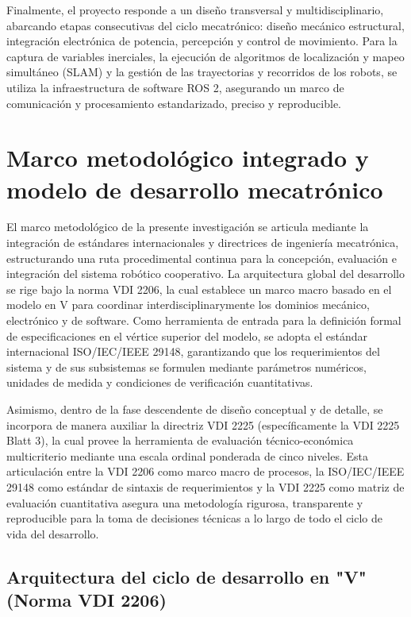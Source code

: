 \noindent
Finalmente, el proyecto responde a un diseño transversal y multidisciplinario, abarcando etapas consecutivas del ciclo mecatrónico: diseño mecánico estructural, integración electrónica de potencia, percepción y control de movimiento. Para la captura de variables inerciales, la ejecución de algoritmos de localización y mapeo simultáneo (SLAM) y la gestión de las trayectorias y recorridos de los robots, se utiliza la infraestructura de software ROS 2, asegurando un marco de comunicación y procesamiento estandarizado, preciso y reproducible.







\section{Marco metodológico integrado y modelo de desarrollo mecatrónico}

\noindent
El marco metodológico de la presente investigación se articula mediante la integración de estándares internacionales y directrices de ingeniería mecatrónica, estructurando una ruta procedimental continua para la concepción, evaluación e integración del sistema robótico cooperativo. La arquitectura global del desarrollo se rige bajo la norma VDI 2206, la cual establece un marco macro basado en el modelo en V para coordinar interdisciplinarymente los dominios mecánico, electrónico y de software. Como herramienta de entrada para la definición formal de especificaciones en el vértice superior del modelo, se adopta el estándar internacional ISO/IEC/IEEE 29148, garantizando que los requerimientos del sistema y de sus subsistemas se formulen mediante parámetros numéricos, unidades de medida y condiciones de verificación cuantitativas.

\noindent
Asimismo, dentro de la fase descendente de diseño conceptual y de detalle, se incorpora de manera auxiliar la directriz VDI 2225 (específicamente la VDI 2225 Blatt 3), la cual provee la herramienta de evaluación técnico-económica multicriterio mediante una escala ordinal ponderada de cinco niveles. Esta articulación entre la VDI 2206 como marco macro de procesos, la ISO/IEC/IEEE 29148 como estándar de sintaxis de requerimientos y la VDI 2225 como matriz de evaluación cuantitativa asegura una metodología rigurosa, transparente y reproducible para la toma de decisiones técnicas a lo largo de todo el ciclo de vida del desarrollo.

\subsection{Arquitectura del ciclo de desarrollo en "V" (Norma VDI 2206)}

